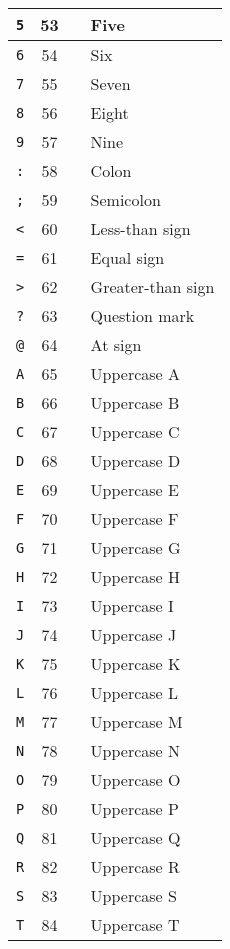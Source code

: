 \documentclass[a4paper]{article}
\theoremstyle{break}
\theoremstyle{break}
\theoremstyle{break}
\theoremstyle{break}
\begin{document}
\begin{xltabular}{\textwidth}{|c|c|c|l|}
	\hline
	\texttt{5} & 53 & & Five \\
	\hline
	\texttt{6} & 54 & & Six \\
	\hline
	\texttt{7} & 55 & & Seven \\
	\hline
	\texttt{8} & 56 & & Eight \\
	\hline
	\texttt{9} & 57 & & Nine \\
	\hline
	\texttt{:} & 58 & & Colon \\
	\hline
	\texttt{;} & 59 & & Semicolon \\
	\hline
	\texttt{<} & 60 & & Less-than sign \\
	\hline
	\texttt{=} & 61 & & Equal sign \\
	\hline
	\texttt{>} & 62 & & Greater-than sign \\
	\hline
	\texttt{?} & 63 & & Question mark \\
	\hline
	\texttt{@} & 64 & & At sign \\
	\hline
	\texttt{A} & 65 & & Uppercase A \\
	\hline
	\texttt{B} & 66 & & Uppercase B \\
	\hline
	\texttt{C} & 67 & & Uppercase C \\
	\hline
	\texttt{D} & 68 & & Uppercase D \\
	\hline
	\texttt{E} & 69 & & Uppercase E \\
	\hline
	\texttt{F} & 70 & & Uppercase F \\
	\hline
	\texttt{G} & 71 & & Uppercase G \\
	\hline
	\texttt{H} & 72 & & Uppercase H \\
	\hline
	\texttt{I} & 73 & & Uppercase I \\
	\hline
	\texttt{J} & 74 & & Uppercase J \\
	\hline
	\texttt{K} & 75 & & Uppercase K \\
	\hline
	\texttt{L} & 76 & & Uppercase L \\
	\hline
	\texttt{M} & 77 & & Uppercase M \\
	\hline
	\texttt{N} & 78 & & Uppercase N \\
	\hline
	\texttt{O} & 79 & & Uppercase O \\
	\hline
	\texttt{P} & 80 & & Uppercase P \\
	\hline
	\texttt{Q} & 81 & & Uppercase Q \\
	\hline
	\texttt{R} & 82 & & Uppercase R \\
	\hline
	\texttt{S} & 83 & & Uppercase S \\
	\hline
	\texttt{T} & 84 & & Uppercase T \\

\end{xltabular}
\end{document}
